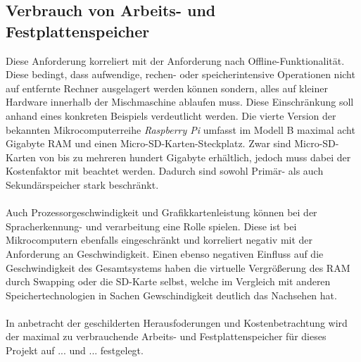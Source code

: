 \subsection{Verbrauch von Arbeits- und Festplattenspeicher}
Diese Anforderung korreliert mit der Anforderung nach Offline-Funktionalität. Diese bedingt, dass aufwendige, rechen- oder speicherintensive Operationen nicht auf entfernte Rechner ausgelagert werden können sondern, alles auf \glqq{}kleiner\grqq{} Hardware innerhalb der Mischmaschine ablaufen muss. Diese Einschränkung soll anhand eines konkreten Beispiels verdeutlicht werden. Die vierte Version der bekannten Mikrocomputerreihe \textit{Raspberry Pi} umfasst im Modell B maximal acht Gigabyte \ac{RAM} und einen Micro-SD-Karten-Steckplatz. Zwar sind Micro-SD-Karten von bis zu mehreren hundert Gigabyte erhältlich, jedoch muss dabei der Kostenfaktor mit beachtet werden. Dadurch sind sowohl Primär- als auch Sekundärspeicher stark beschränkt.\\\\
Auch Prozessorgeschwindigkeit und Grafikkartenleistung können bei der Spracherkennung- und verarbeitung eine Rolle spielen. Diese ist bei Mikrocomputern ebenfalls eingeschränkt und korreliert negativ mit der Anforderung an Geschwindigkeit. Einen ebenso negativen Einfluss auf die Geschwindigkeit des Gesamtsystems haben die virtuelle Vergrößerung des \ac{RAM} durch Swapping oder die SD-Karte selbst, welche im Vergleich mit anderen Speichertechnologien in Sachen Gewschindigkeit deutlich das Nachsehen hat.\\\\
In anbetracht der geschilderten Herausfoderungen und Kostenbetrachtung wird der maximal zu verbrauchende Arbeits- und Festplattenspeicher für dieses Projekt auf ... und ... festgelegt.
\endinput